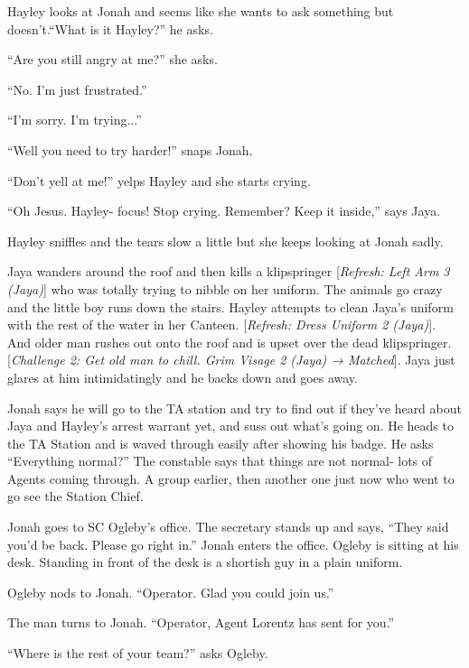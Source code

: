 Hayley looks at Jonah and seems like she wants to ask something but doesn't.``What is it Hayley?'' he asks.

``Are you still angry at me?'' she asks.

``No.  I'm just frustrated.''

``I'm sorry.  I'm trying...''

``Well you need to try harder!'' snaps Jonah.

``Don't yell at me!'' yelps Hayley and she starts crying.

``Oh Jesus.  Hayley- focus!  Stop crying.  Remember?  Keep it inside,'' says Jaya.

Hayley sniffles and the tears slow a little but she keeps looking at Jonah sadly.



Jaya wanders around the roof and then kills a klipspringer {[}\textit{Refresh: Left Arm 3 (Jaya)}{]} who was totally trying to nibble on her uniform.  The animals go crazy and the little boy runs down the stairs.  Hayley attempts to clean Jaya's uniform with the rest of the water in her Canteen.  {[}\textit{Refresh: Dress Uniform 2 (Jaya)}{]}. And older man rushes out onto the roof and is upset over the dead klipspringer.   {[}\textit{Challenge 2: Get old man to chill.  Grim Visage 2 (Jaya) → Matched}{]}.  Jaya just glares at him intimidatingly and he backs down and goes away.



Jonah says he will go to the TA station and try to find out if they've heard about Jaya and Hayley's arrest warrant yet, and suss out what's going on.  He heads to the TA Station and is waved through easily after showing his badge.  He asks ``Everything normal?''  The constable says that things are not normal- lots of Agents coming through.  A group earlier, then another one just now who went to go see the Station Chief.



Jonah goes to SC Ogleby's office.  The secretary stands up and says, ``They said you'd be back.  Please go right in.''  Jonah enters the office.  Ogleby is sitting at his desk.  Standing in front of the desk is a shortish guy in a plain uniform.  

Ogleby nods to Jonah.  ``Operator.  Glad you could join us.''

The man turns to Jonah.  ``Operator, Agent Lorentz has sent for you.''

``Where is the rest of your team?'' asks Ogleby.

